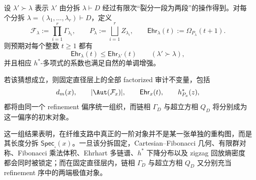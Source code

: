 \begin{conjecture}\label{conj:conclusion-fiber-partition-refinement-unifies-factorized-audits}
设 \(\lambda' \succ \lambda\) 表示 \(\lambda'\) 由分拆 \(\lambda\vdash D\) 经过有限次“裂分一段为两段”的操作得到。对每个分拆 \(\lambda=(\lambda_1,\dots,\lambda_r)\vdash D\)，定义
\[
\mathcal F_\lambda:=\prod_{i=1}^r \Gamma_{\lambda_i},
\qquad
P_\lambda:=\bigsqcup_{i=1}^r Z_{\lambda_i},
\qquad
\mathsf{Ehr}_\lambda(t):=\Omega_{P_\lambda}(t+1).
\]
则预期对每个整数 \(t\ge 1\) 都有
\[
\mathsf{Ehr}_\lambda(t)\le \mathsf{Ehr}_{\lambda'}(t)
\qquad(\lambda'\succ \lambda),
\]
并且相应 \(h^\ast\)-多项式的系数也满足自然的单调增强。

若该猜想成立，则固定直径层上的全部 factorized 审计不变量，包括
\[
d_m(x),\qquad
|\Aut(\mathcal F_x)|,\qquad
\mathsf{Ehr}_x(t),\qquad
h_{P_x}^\ast(z),
\]
都将由同一个 refinement 偏序统一组织，而链相 \(\Gamma_D\) 与超立方相 \(Q_D\) 将分别成为这一偏序的初末对象。
\end{conjecture}

\noindent
这一组结果表明，在纤维支路中真正的一阶对象并不是某一张单独的重构图，而是其长度分拆 \(\mathsf{Spec}_{\square}(x)\)。一旦该分拆固定，Cartesian--Fibonacci 几何、有限群对称、Fibonacci 乘法体积、Ehrhart 多链谱、\(h^\ast\) 下降分布以及 zigzag 回放熵密度都会同时被锁定；而在固定直径层内，链相 \(\Gamma_D\) 与超立方相 \(Q_D\) 又分别充当 refinement 序中的两端极值对象。

\endinput
